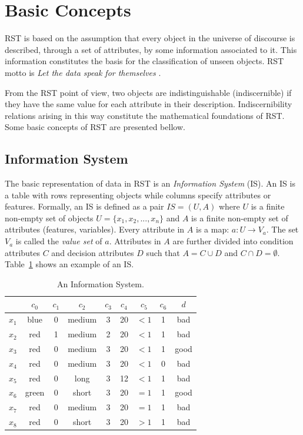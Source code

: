 \documentclass[authoryear,preprint,review,12pt]{elsarticle}
\begin{document}
\section{Basic Concepts}\label{basicConcepts}
  RST is based on the assumption that every object in the universe of discourse is described, through a set of attributes, by some information associated to it. This information constitutes the basis for the classification of unseen objects. RST motto is \textit{Let the data speak for themselves} \citep{Tiwari14}.

  From the RST point of view, two objects are indistinguishable (indiscernible) if they have the same value for each attribute in their description. Indiscernibility relations arising in this way constitute the mathematical foundations of RST. Some basic concepts of RST are presented bellow.
  
\subsection{Information System}
  The basic representation of data in RST is an \emph{Information System} (IS). An IS is a table with rows
  representing objects while columns specify attributes or features. Formally, an IS is defined as a pair
  $IS=(U,A)$ where $U$ is a finite non-empty set of objects $U=\lbrace x_1,x_2,...,x_n\rbrace$ and $A$ is a 
  finite non-empty set
  of attributes (features, variables). Every attribute in $A$ is a map: $a: U \rightarrow V_a$. The set $V_a$ is
  called the \textit{value set} of $a$. Attributes in $A$ are further divided into condition attributes $C$ and 
  decision attributes $D$ such that $A=C \cup D$ and $C \cap D =\emptyset$. 
  Table~\ref{tab_IS} shows an example of an IS.
  
 \begin{table}[htb]
		\caption{An Information System.} \label{tab_IS}
		\centering
 	\begin{tabular}{c||c|c|c|c|c|c|c||c}
 			  & $c_0$ & $c_1$ & $c_2$ &  $c_3$ & $c_4$ & $c_5$ &  $c_6$ & $d$ \\
 		\hline \hline
		$x_1$ &   blue  & 0 & medium & 3 & 20 & $<1$  & 1 & bad   \\
		$x_2$ &   red   & 1 & medium & 2 & 20 & $<1$  & 1 & bad   \\
		$x_3$ &   red   & 0 & medium & 3 & 20 & $<1$  & 1 & good   \\
		$x_4$ &   red   & 0 & medium & 3 & 20 & $<1$  & 0 & bad   \\
		$x_5$ &   red   & 0 & long   & 3 & 12 & $<1$  & 1 & bad   \\
		$x_6$ &   green & 0 & short  & 3 & 20 & $=1$  & 1 & good   \\
		$x_7$ &   red   & 0 & medium & 3 & 20 & $=1$  & 1 & bad   \\
		$x_8$ &   red   & 0 & short  & 3 & 20 & $>1$  & 1 & bad   \\
 	\end{tabular}             
 \end{table}
 
\end{document}
